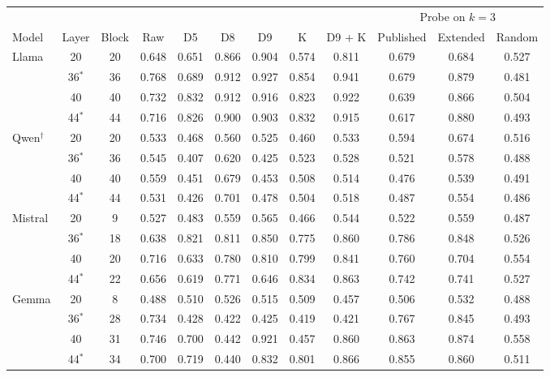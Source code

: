 \begin{tabular}{@{}l cc cccccc ccc@{}}
\toprule
 & & & & & & & & & \multicolumn{3}{c}{Probe on $k = 3$} \\
\cmidrule(lr){10-12}
Model & Layer & Block & Raw & D5 & D8 & D9 & K & D9 + K & Published & Extended & Random \\
\midrule
Llama & 20 & 20 & 0.648 & 0.651 & 0.866 & 0.904 & 0.574 & 0.811 & 0.679 & 0.684 & 0.527 \\
 & 36$^*$ & 36 & 0.768 & 0.689 & 0.912 & 0.927 & 0.854 & 0.941 & 0.679 & 0.879 & 0.481 \\
 & 40 & 40 & 0.732 & 0.832 & 0.912 & 0.916 & 0.823 & 0.922 & 0.639 & 0.866 & 0.504 \\
 & 44$^*$ & 44 & 0.716 & 0.826 & 0.900 & 0.903 & 0.832 & 0.915 & 0.617 & 0.880 & 0.493 \\
\addlinespace
Qwen$^\dagger$ & 20 & 20 & 0.533 & 0.468 & 0.560 & 0.525 & 0.460 & 0.533 & 0.594 & 0.674 & 0.516 \\
 & 36$^*$ & 36 & 0.545 & 0.407 & 0.620 & 0.425 & 0.523 & 0.528 & 0.521 & 0.578 & 0.488 \\
 & 40 & 40 & 0.559 & 0.451 & 0.679 & 0.453 & 0.508 & 0.514 & 0.476 & 0.539 & 0.491 \\
 & 44$^*$ & 44 & 0.531 & 0.426 & 0.701 & 0.478 & 0.504 & 0.518 & 0.487 & 0.554 & 0.486 \\
\addlinespace
Mistral & 20 & 9 & 0.527 & 0.483 & 0.559 & 0.565 & 0.466 & 0.544 & 0.522 & 0.559 & 0.487 \\
 & 36$^*$ & 18 & 0.638 & 0.821 & 0.811 & 0.850 & 0.775 & 0.860 & 0.786 & 0.848 & 0.526 \\
 & 40 & 20 & 0.716 & 0.633 & 0.780 & 0.810 & 0.799 & 0.841 & 0.760 & 0.704 & 0.554 \\
 & 44$^*$ & 22 & 0.656 & 0.619 & 0.771 & 0.646 & 0.834 & 0.863 & 0.742 & 0.741 & 0.527 \\
\addlinespace
Gemma & 20 & 8 & 0.488 & 0.510 & 0.526 & 0.515 & 0.509 & 0.457 & 0.506 & 0.532 & 0.488 \\
 & 36$^*$ & 28 & 0.734 & 0.428 & 0.422 & 0.425 & 0.419 & 0.421 & 0.767 & 0.845 & 0.493 \\
 & 40 & 31 & 0.746 & 0.700 & 0.442 & 0.921 & 0.457 & 0.860 & 0.863 & 0.874 & 0.558 \\
 & 44$^*$ & 34 & 0.700 & 0.719 & 0.440 & 0.832 & 0.801 & 0.866 & 0.855 & 0.860 & 0.511 \\
\bottomrule
\end{tabular}
